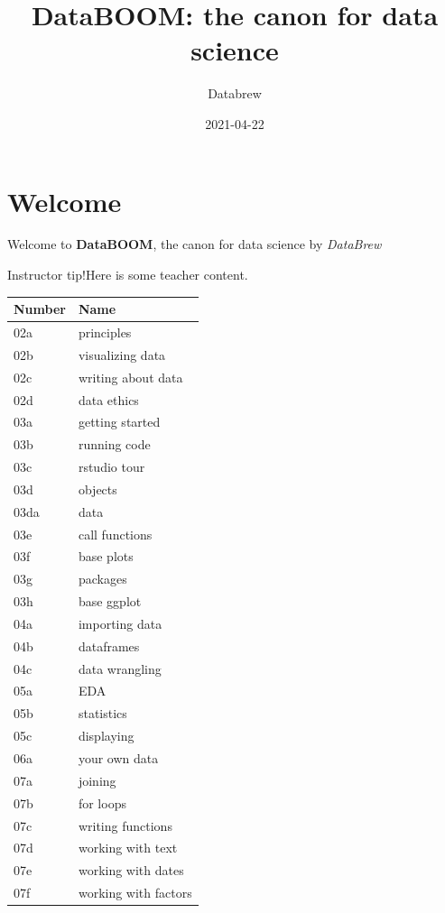\documentclass[
]{book}
\title{DataBOOM: the canon for data science}
\author{Databrew}
\date{2021-04-22}
\begin{document}
\maketitle

{
\setcounter{tocdepth}{1}
\tableofcontents
}
\hypertarget{welcome}{%
\chapter{Welcome}\label{welcome}}

Welcome to \textbf{DataBOOM}, the canon for data science by \emph{DataBrew}

Instructor tip!Here is some teacher content.

\begin{tabular}{l|l}
\hline
Number & Name\\
\hline
02a & principles\\
\hline
02b & visualizing data\\
\hline
02c & writing about data\\
\hline
02d & data ethics\\
\hline
03a & getting started\\
\hline
03b & running code\\
\hline
03c & rstudio tour\\
\hline
03d & objects\\
\hline
03da & data\\
\hline
03e & call functions\\
\hline
03f & base plots\\
\hline
03g & packages\\
\hline
03h & base ggplot\\
\hline
04a & importing data\\
\hline
04b & dataframes\\
\hline
04c & data wrangling\\
\hline
05a & EDA\\
\hline
05b & statistics\\
\hline
05c & displaying\\
\hline
06a & your own data\\
\hline
07a & joining\\
\hline
07b & for loops\\
\hline
07c & writing functions\\
\hline
07d & working with text\\
\hline
07e & working with dates\\
\hline
07f & working with factors\\

\end{tabular}
\end{document}
